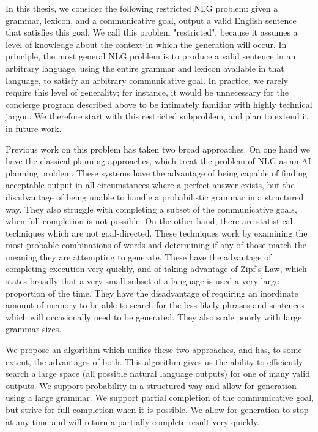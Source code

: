 In this thesis, we consider the following restricted NLG problem: given a
grammar, lexicon, and a communicative goal, output a valid English
sentence that satisfies this goal.  We call this problem "restricted", because
it assumes a level of knowledge about the context in which the generation
will occur.  In principle, the most general NLG problem is to produce a valid
sentence in an arbitrary language, using the entire grammar and lexicon available
in that language, to satisfy an arbitrary communicative goal.  In practice, we
rarely require this level of generality; for instance, it would be unnecessary for the concierge
program described above to be intimately familiar with highly technical jargon.
We therefore start with this restricted subproblem, and plan to extend it in future work.

Previous work on this problem has taken two broad approaches.  On one hand we have
the classical planning approaches, which treat the problem of NLG as an AI planning
problem.  These systems have the advantage of being capable of finding acceptable
output in all circumstances where a perfect answer exists, but the disadvantage of
being unable to handle a probabilistic grammar in a structured way.  They also struggle
with completing a subset of the communicative goals, when full completion is not
possible.  On the other hand, there are statistical techniques which are not goal-directed.
These techniques work by examining the
most probable combinations of words and determining if any of those match the
meaning they are attempting to generate.  These have the advantage of completing
execution very quickly, and of taking advantage of Zipf's Law, which states broadly that
a very small subset of a language is used a very large proportion of the time.  They
have the disadvantage of requiring an inordinate amount of memory to be able to search
for the less-likely phrases and sentences which will occasionally need to be generated.
They also scale poorly with large grammar sizes.

We propose an algorithm which unifies these two approaches, and has, to some extent,
the advantages of both.  This algorithm gives
us the ability to efficiently search a large space (all possible natural language outputs) for 
one of many valid outputs.  We support probability in a structured way and allow
for generation using a large grammar.  We support partial completion of the communicative
goal, but strive for full completion when it is possible.  We allow for generation to stop
at any time and will return a partially-complete result very quickly.

